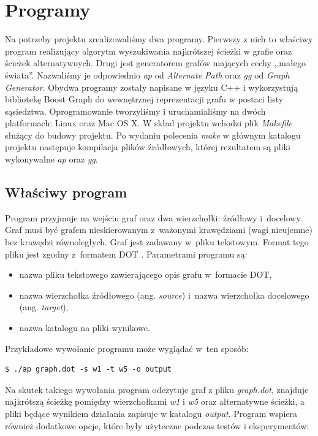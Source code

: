 \documentclass[a4paper, 12pt]{article}
\begin{document}
\section{Programy}

Na potrzeby projektu zrealizowaliśmy dwa programy. Pierwszy z nich to właściwy program realizujący algorytm wyszukiwania najkrótszej ścieżki w grafie oraz ścieżek alternatywnych. Drugi jest generatorem grafów mających cechy ,,małego świata''. Nazwaliśmy je odpowiednio {\it ap} od {\it Alternate Path} oraz {\it gg} od {\it Graph Generator}. Obydwa programy zostały napisane w języku C++ i wykorzystują bibliotekę Boost Graph \cite{bgl} do wewnętrznej reprezentacji grafu w postaci listy sąsiedztwa. Oprogramowanie tworzyliśmy i uruchamialiśmy na dwóch platformach: Linux oraz Mac OS X. W skład projektu wchodzi plik {\it Makefile} służący do budowy projektu. Po wydaniu polecenia {\it make} w głównym katalogu projektu następuje kompilacja plików źródłowych, której rezultatem są pliki wykonywalne {\it ap} oraz {\it gg}.

\subsection{Właściwy program}

Program przyjmuje na wejściu graf oraz dwa wierzchołki: źródłowy i~docelowy. Graf musi być grafem nieskierowanym z~ważonymi krawędziami (wagi nieujemne) bez krawędzi równoległych. Graf jest zadawany w~pliku tekstowym. Format tego pliku jest zgodny z~formatem DOT \cite{dot}. Parametrami programu są:

\begin{itemize}
\item nazwa pliku tekstowego zawierającego opis grafu w~formacie DOT,
\item nazwa wierzchołka źródłowego (ang. {\it source}) i~nazwa wierzchołka docelowego (ang. {\it target}),
\item nazwa katalogu na pliki wynikowe.
\end{itemize}

Przykładowe wywołanie programu może wyglądać w~ten sposób:

\begin{verbatim}
$ ./ap graph.dot -s w1 -t w5 -o output
\end{verbatim}

Na skutek takiego wywołania program odczytuje graf z pliku {\it graph.dot}, znajduje najkrótszą ścieżkę pomiędzy wierzchołkami {\it w1} i {\it w5} oraz alternatywne ścieżki, a pliki będące wynikiem działania zapisuje w katalogu {\it output}. Program wspiera również dodatkowe opcje, które były użyteczne podczas testów i eksperymentów:
\end{document}
